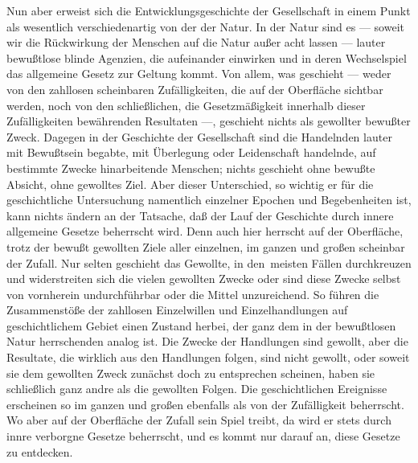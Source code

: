 Nun aber erweist sich die Entwicklungsgeschichte der
Gesellschaft in einem Punkt als wesentlich verschiedenartig von der der
Natur. In der Natur sind es --- soweit wir die Rückwirkung der Menschen
auf die Natur außer acht lassen --- lauter bewußtlose blinde Agenzien, die
aufeinander einwirken und in deren Wechselspiel das allgemeine Gesetz
zur Geltung kommt. Von allem, was geschieht --- weder von den zahllosen
scheinbaren Zufälligkeiten, die auf der Oberfläche sichtbar werden, noch
von den schließlichen, die Gesetzmäßigkeit innerhalb dieser
Zufälligkeiten bewährenden Resultaten ---, geschieht nichts als gewollter
bewußter Zweck. Dagegen in der Geschichte der Gesellschaft sind die
Handelnden lauter mit Bewußtsein begabte, mit Überlegung oder
Leidenschaft handelnde, auf bestimmte Zwecke hinarbeitende Menschen;
nichts geschieht ohne bewußte Absicht, ohne gewolltes Ziel. Aber dieser
Unterschied, so wichtig er für die geschichtliche Untersuchung
namentlich einzelner Epochen und Begebenheiten ist, kann nichts ändern
an der Tatsache, daß der Lauf der Geschichte durch innere allgemeine
Gesetze beherrscht wird. Denn auch hier herrscht auf der Oberfläche,
trotz der bewußt gewollten Ziele aller einzelnen, im ganzen und großen
scheinbar der Zufall. Nur selten geschieht das Gewollte, in
den \textbar{}\,meisten Fällen
durchkreuzen und widerstreiten sich die vielen gewollten Zwecke oder
sind diese Zwecke selbst von vornherein undurchführbar oder die Mittel
unzureichend. So führen die Zusammenstöße der zahllosen Einzelwillen und
Einzelhandlungen auf geschichtlichem Gebiet einen Zustand herbei, der
ganz dem in der bewußtlosen Natur herrschenden analog ist. Die Zwecke
der Handlungen sind gewollt, aber die Resultate, die wirklich aus den
Handlungen folgen, sind nicht gewollt, oder soweit sie dem gewollten
Zweck zunächst doch zu entsprechen scheinen, haben sie schließlich ganz
andre als die gewollten Folgen. Die geschichtlichen Ereignisse
erscheinen so im ganzen und großen ebenfalls als von der Zufälligkeit
beherrscht. Wo aber auf der Oberfläche der Zufall sein Spiel treibt, da
wird er stets durch innre verborgne Gesetze beherrscht, und es kommt nur
darauf an, diese Gesetze zu entdecken.\est\

